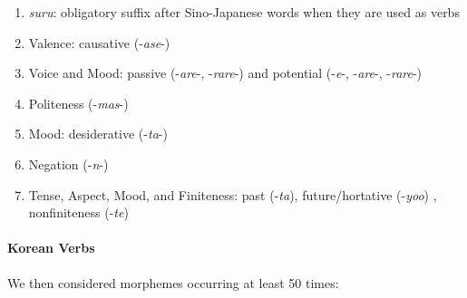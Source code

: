 \documentclass[11pt,letterpaper]{article}
\begin{document}
\begin{enumerate}
\item \textit{suru}: obligatory suffix after Sino-Japanese words when they are used as verbs
\item Valence: causative (-\textit{ase}-)
\item Voice and Mood: passive (-\textit{are}-, -\textit{rare}-) and potential (-\textit{e}-, -\textit{are}-, -\textit{rare}-)
\item Politeness (-\textit{mas}-)
\item Mood: desiderative (-\textit{ta}-)
\item Negation (-\textit{n}-)
\item Tense, Aspect, Mood, and Finiteness: past (-\textit{ta}), future/hortative (-\textit{yoo}) \citep[229]{kaiser2013japanese}, nonfiniteness (-\textit{te})
\end{enumerate}



\paragraph{Korean Verbs}

We then considered morphemes occurring at least 50 times:

\citep{yeon2010korean}
\end{document}
